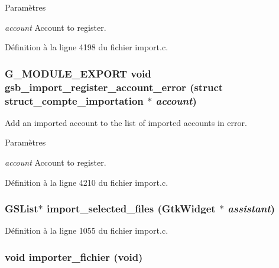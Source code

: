 \begin{DoxyParams}{Paramètres}
\item[{\em account}]Account to register. \end{DoxyParams}


Définition à la ligne 4198 du fichier import.c.

\subsubsection[{gsb\_\-import\_\-register\_\-account\_\-error}]{\setlength{\rightskip}{0pt plus 5cm}G\_\-MODULE\_\-EXPORT void gsb\_\-import\_\-register\_\-account\_\-error (struct {\bf struct\_\-compte\_\-importation} $\ast$ {\em account})}\label{import_8c_a4bfa72d8a4cd4f0cb17bcce05e286607}
Add an imported account to the list of imported accounts in error.


\begin{DoxyParams}{Paramètres}
\item[{\em account}]Account to register. \end{DoxyParams}


Définition à la ligne 4210 du fichier import.c.

\subsubsection[{import\_\-selected\_\-files}]{\setlength{\rightskip}{0pt plus 5cm}GSList$\ast$ import\_\-selected\_\-files (GtkWidget $\ast$ {\em assistant})}\label{import_8c_af47b0c4c36291dc40375ad1d3b402880}


Définition à la ligne 1055 du fichier import.c.

\subsubsection[{importer\_\-fichier}]{\setlength{\rightskip}{0pt plus 5cm}void importer\_\-fichier (void)}\label{import_8c_a109c976310f1373efb8fdb52b3ee4263}



